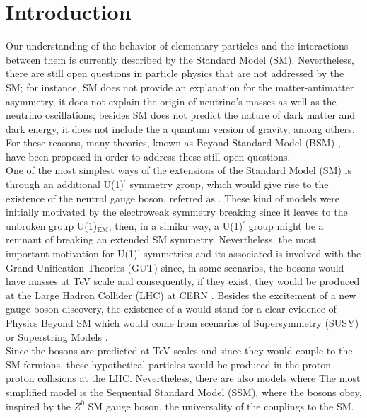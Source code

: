 \chapter*{Introduction}

Our understanding of the behavior of elementary particles and the interactions between them is 
currently described by the Standard Model (SM). Nevertheless, there are still open 
questions in particle physics that are not addressed by the SM; for instance, SM does 
not provide an explanation for the matter-antimatter asymmetry, it does not explain the origin of neutrino's masses as well as the 
neutrino oscillations; besides SM does not predict the nature of dark matter and dark energy,
it does not include the a quantum version of gravity, among others. For these reasons, 
many theories, known as Beyond Standard Model (BSM) \cite{BSM}, have been proposed in order to address these still open questions. \\

One of the most simplest ways of the extensions of the Standard Model (SM) is through an additional
U(1)$^{\prime}$ symmetry group, which would give rise to the existence of the neutral gauge boson, referred as \Zprime. These 
kind of models were initially motivated by the electroweak symmetry breaking since it leaves to the unbroken group 
U(1)$_{\text{EM}}$; then, in a similar way, a U(1)$^{\prime}$ group might be a remnant of breaking  
an extended SM symmetry. Nevertheless, the most important motivation for U(1)$^{\prime}$ symmetries 
and its associated \Zprime is involved with the Grand Unification Theories (GUT) since, in some scenarios, the \Zprime bosons
would have masses at TeV scale and consequently, if they exist, they would be produced at the Large Hadron 
Collider (LHC) at CERN \cite{Langacker:2008yv}. Besides the excitement of a new gauge boson discovery, the existence 
of a \Zprime  would stand for a clear evidence of Physics Beyond SM which would come from scenarios of 
Supersymmetry (SUSY) or Superstring Models \cite{Langacker:2008yv}. \\

Since the \Zprime bosons are predicted at TeV scales and since they would couple to the SM fermions, 
these hypothetical particles would be produced in the proton-proton collisions at the LHC.
Nevertheless, there are also models where 
The most simplified model is the Sequential Standard Model (SSM), where the \Zprime bosons 
obey, inspired by the $Z^{0}$ SM gauge boson, the universality of the couplings to the SM. 


